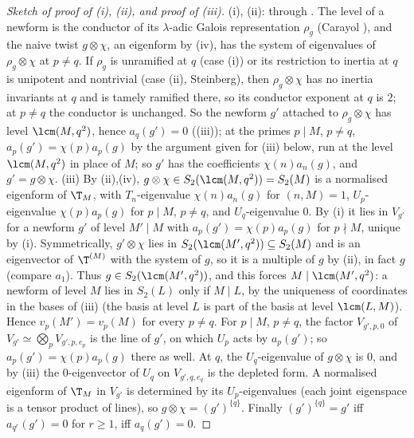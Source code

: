 \begin{proof}[Sketch of proof of (i), (ii), and proof of (iii)]
(i), (ii): through . The level of a newform is the conductor of its $\lambda$-adic Galois representation $\rho_g$ (Carayol \cite{Carayol86}), and the naive twist
$g\otimes\chi$, an eigenform by (iv), has the system of eigenvalues of $\rho_g\otimes\chi$ at $p\ne q$. If $\rho_g$ is unramified at $q$ (case (i)) or its restriction
to inertia at $q$ is unipotent and nontrivial (case (ii), Steinberg), then $\rho_g\otimes\chi$ has no inertia invariants at $q$ and is tamely ramified there, so its conductor exponent at $q$ is
$2$; at $p\ne q$ the conductor is unchanged. So the newform $g'$ attached to $\rho_g\otimes\chi$ has level $\lcm(M,q^2)$, hence $a_q(g')=0$ ((iii)); at the primes $p\mid M$,
$p\ne q$, $a_p(g')=\chi(p)a_p(g)$ by the argument given for (iii) below, run at the level $\lcm(M,q^2)$ in place of $M$; so $g'$ has the coefficients $\chi(n)a_n(g)$, and $g'=g\otimes\chi$.
(iii) By (ii),(iv), $g\otimes\chi\in S_2(\lcm(M,q^2))=S_2(M)$ is a normalised eigenform of $\T_M$, with $T_n$-eigenvalue $\chi(n)a_n(g)$ for $(n,M)=1$, $U_p$-eigenvalue
$\chi(p)a_p(g)$ for $p\mid M$, $p\ne q$, and $U_q$-eigenvalue $0$. By (i) it lies in $V_{g'}$ for a newform $g'$ of level $M'\mid M$ with $a_p(g')=\chi(p)a_p(g)$ for $p\nmid M$,
unique by (i). Symmetrically, $g'\otimes\chi$ lies in $S_2(\lcm(M',q^2))\subseteq S_2(M)$ and is an eigenvector of $\T^{(M)}$ with the system of $g$, so it is a multiple of $g$ by
(ii), in fact $g$ (compare $a_1$). Thus $g\in S_2(\lcm(M',q^2))$, and this forces $M\mid\lcm(M',q^2)$: a newform of level $M$ lies in $S_2(L)$ only if $M\mid L$, by the
uniqueness of coordinates in the bases of (iii) (the basis at level $L$ is part of the basis at level $\lcm(L,M)$). Hence $v_p(M')=v_p(M)$ for every
$p\ne q$. For $p\mid M$, $p\ne q$, the factor $V_{g',p,0}$ of $V_{g'}\simeq\bigotimes_pV_{g',p,e_p}$ is the line of $g'$, on which $U_p$ acts by $a_p(g')$; so $a_p(g')=\chi(p)a_p(g)$ there as well. At $q$, the
$U_q$-eigenvalue of $g\otimes\chi$ is $0$, and by (iii) the $0$-eigenvector of $U_q$ on $V_{g',q,e_q}$ is the depleted form. A normalised eigenform of $\T_M$ in $V_{g'}$ is
determined by its $U_p$-eigenvalues (each joint eigenspace is a tensor product of lines), so $g\otimes\chi=(g')^{\{q\}}$. Finally $(g')^{\{q\}}=g'$ iff $a_{q^r}(g')=0$ for $r\ge1$, iff $a_q(g')=0$.
\end{proof}

